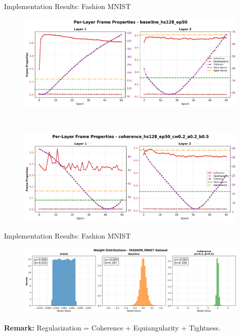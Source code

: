 \documentclass[9pt,dvipsnames]{beamer}
\begin{document}
\begin{frame}{Implementation Results: Fashion MNIST}
    \begin{figure}[H]
        \centering
        \begin{minipage}[b]{\textwidth}
            \centering
            \includegraphics[width=\textwidth,height=0.45\textheight,keepaspectratio]{../plots/mlp/fashion_mnist/hs128_ep50/baseline_hs128_ep50_coherence_analysis.png}
        \end{minipage}\\[0.1em]
        \begin{minipage}[b]{\textwidth}
            \centering
            \includegraphics[width=\textwidth,height=0.45\textheight,keepaspectratio]{../plots/mlp/fashion_mnist/hs128_ep50/coherence_hs128_ep50_cw0.2_a0.2_b0.5_coherence_analysis.png}
        \end{minipage}
    \end{figure}
\end{frame}
\begin{frame}{Implementation Results: Fashion MNIST}
    \begin{figure}[H]
        \centering
        \includegraphics[width=\textwidth]{../plots/mlp/fashion_mnist/hs128_ep50/weights_distribution_baseline.png}
    \end{figure}

	\textbf{Remark:} Regularization = Coherence + Equiangularity + Tightness.
\end{frame}
\end{document}
